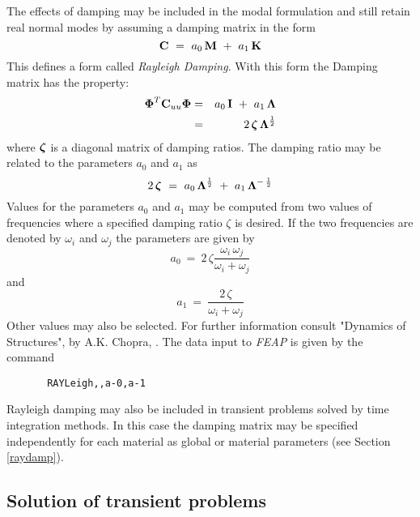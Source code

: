 The effects of damping may be included in the modal formulation
and still retain real normal modes by assuming a damping matrix in the form
\begin{equation}
\label{eqm15}
\mathbf{C} ~=~ a_0 \, \mathbf{M} ~+~ a_1 \, \mathbf{K}
\end{equation}
This defines a form called {\it Rayleigh Damping}.
With this form the Damping matrix has the property:
\begin{eqnarray}
\label{eqm16}
\boldsymbol{\Phi}^T \mathbf{C}_{uu} \boldsymbol{\Phi} &=& a_0 \, \mathbf{I} ~+~ a_1 \, \boldsymbol{\Lambda}
\nonumber \\
&=& 2 \, \boldsymbol{\zeta} \, \boldsymbol{\Lambda}^\frac{1}{2}
\end{eqnarray}
where $\boldsymbol{\zeta}$ is a diagonal matrix of damping ratios.
The damping ratio may be related to the parameters $a_0$ and $a_1$ as
\begin{equation}
\label{eqm16a}
2 \, \boldsymbol{\zeta} ~=~ a_0 \, \boldsymbol{\Lambda}^{\frac{1}{2}}
~+~ a_1 \, \boldsymbol{\Lambda}^{- \, \frac{1}{2}}
\end{equation}
Values for the parameters $a_0$ and $a_1$ may be computed from two values
of frequencies where a specified damping ratio $\zeta$ is desired.  If
the two frequencies are denoted by $\omega_i$ and $\omega_j$ the parameters
are given by
\begin{equation}
\label{eqm16b}
a_0 ~=~ 2 \, \zeta \frac{\omega_i \, \omega_j}{\omega_i + \omega_j}
\end{equation}
and
\begin{equation}
\label{eqm16c}
a_1 ~=~ \frac{2 \, \zeta }{\omega_i + \omega_j}
\end{equation}
Other values may also be selected.
For further information consult "Dynamics of Structures", by A.K. Chopra,
\cite{chopra}.
The data input to {\sl FEAP} is given by the command
\begin{verbatim}
       RAYLeigh,,a-0,a-1
\end{verbatim}

Rayleigh damping may also be included in transient problems solved 
by time integration methods.  In this case the damping matrix may be specified
independently for each material as global or
material parameters (see Section \ref{raydamp}).

\subsection{Solution of transient problems}
\label{modsol}

